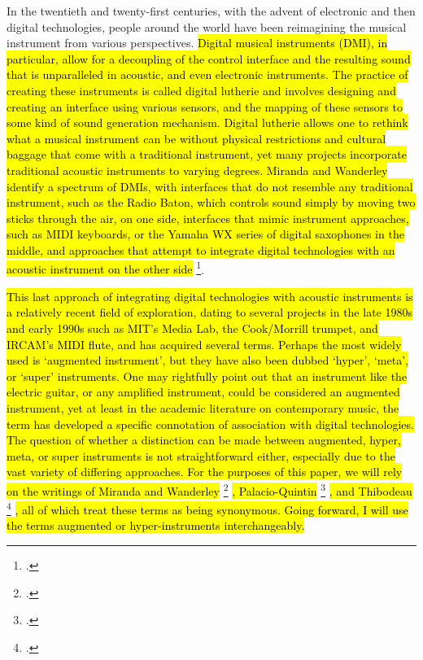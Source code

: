 \documentclass[12pt,twoside,maitrise]{dms_ks}
\theoremstyle{definition}
\begin{document}
In the twentieth and twenty-first centuries, with the advent of electronic and then digital technologies, people around the world have been reimagining the musical instrument from various perspectives. 
\hl{Digital musical instruments (DMI), in particular, allow for a decoupling of the control interface and the resulting sound that is unparalleled in acoustic, and even electronic instruments.
The practice of creating these instruments is called digital lutherie and involves designing and creating an interface using various sensors, and the mapping of these sensors to some kind of sound generation mechanism.
Digital lutherie allows one to rethink what a musical instrument can be without physical restrictions and cultural baggage that come with a traditional instrument, yet many projects incorporate traditional acoustic instruments to varying degrees. 
Miranda and Wanderley identify a spectrum of DMIs, with interfaces that do not resemble any traditional instrument, such as the Radio Baton, which controls sound simply by moving two sticks through the air, on one side, interfaces that mimic instrument approaches, such as MIDI keyboards, or the Yamaha WX series of digital saxophones in the middle, and approaches that attempt to integrate digital technologies with an acoustic instrument on the other side} \footcite[19-20]{miranda_new_2006}.


\hl{This last approach of integrating digital technologies with acoustic instruments is a relatively recent field of exploration, dating to several projects in the late 1980s and early 1990s such as MIT's Media Lab, the Cook/Morrill trumpet, and IRCAM's MIDI flute, and has acquired several terms.
Perhaps the most widely used is `augmented instrument', but they have also been dubbed `hyper', `meta', or `super' instruments.
One may rightfully point out that an instrument like the electric guitar, or any amplified instrument, could be considered an augmented instrument, yet at least in the academic literature on contemporary music, the term has developed a specific connotation of association with digital technologies. 
The question of whether a distinction can be made between augmented, hyper, meta, or super instruments is not straightforward either, especially due to the vast variety of differing approaches.
For the purposes of this paper, we will rely on the writings of Miranda and Wanderley} \footcite[21]{miranda_new_2006} \hl{, Palacio-Quintin} \footcite[25]{palacio-quintin_composition_2012-1} \hl{, and Thibodeau } \footcite[1]{thibodeau_trumpet_2011} \hl{, all of which treat these terms as being synonymous.
Going forward, I will use the terms augmented or hyper-instruments interchangeably.}
\end{document}
